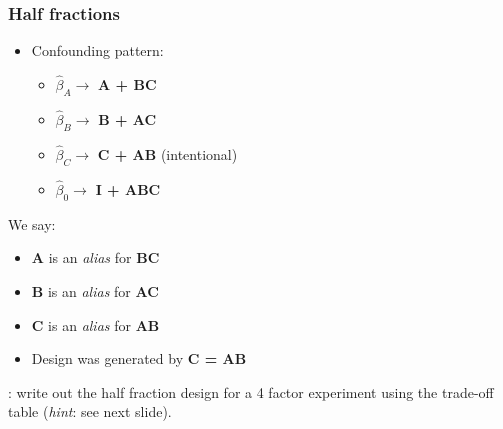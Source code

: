 \begin{frame}\frametitle{Half fractions}
	\begin{itemize}
		\item	Confounding pattern:
		\begin{itemize}
			\item	$\widehat{\beta}_A \rightarrow$ \textbf{A + BC}
			\item	$\widehat{\beta}_B \rightarrow$ \textbf{B + AC}
			\item	$\widehat{\beta}_C \rightarrow$ \textbf{C + AB} (intentional)
			\item	$\widehat{\beta}_0 \rightarrow$ \textbf{I + ABC}
		\end{itemize}
	\end{itemize}

	We say:
	\begin{itemize}
		\item	\textbf{A} is an \emph{alias} for \textbf{BC}
		\item	\textbf{B} is an \emph{alias} for \textbf{AC}
		\item	\textbf{C} is an \emph{alias} for \textbf{AB}
		\item	Design was generated by \textbf{C = AB}
	\end{itemize}
	
	\vspace{12pt}
	{\color{myOrange}{Homework}}: write out the half fraction design for a 4 factor experiment using the trade-off table (\emph{hint}: see next slide).
\end{frame}


